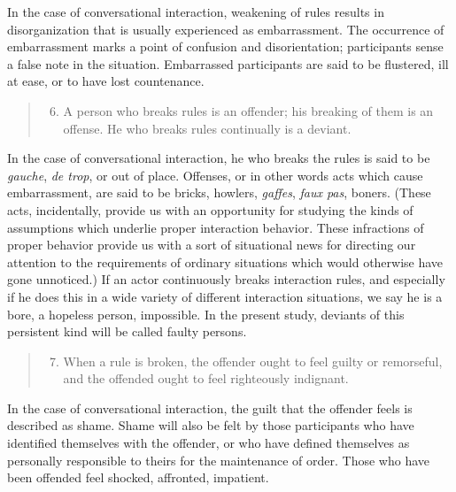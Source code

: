 \documentclass[twoside,symmetric,nobib,justified]{tufte-book}
\begin{document}
\noindent In the case of conversational interaction, weakening of rules results in
disorganization that is usually experienced as embarrassment. The
occurrence of embarrassment marks a point of confusion and
disorientation; participants sense a false note in the situation.
Embarrassed participants are said to be flustered, ill at ease, or to
have lost countenance.

\begin{quote}
\begin{enumerate}
\setcounter{enumi}{5}
\item
  A person who breaks rules is an offender; his breaking of them is an
  offense. He who breaks rules continually is a deviant.
\end{enumerate}
\end{quote}

\noindent In the case of conversational interaction, he who breaks the rules is
said to be \emph{gauche}, \emph{de trop}, or out of place. Offenses, or
in other words acts which cause embarrassment, are said to be bricks,
howlers, \emph{gaffes}, \emph{faux pas}, boners. (These acts,
incidentally, provide us with an opportunity for studying the kinds of
assumptions which underlie proper interaction behavior. These
infractions of proper behavior provide us with a sort of situational
news for directing our attention to the requirements of ordinary
situations which would otherwise have gone unnoticed.) If an actor
continuously breaks interaction rules, and especially if he does this in
a wide variety of different interaction situations, we say he is a bore,
a hopeless person, impossible. In the present study, deviants of this
persistent kind will be called faulty persons.


\begin{quote}
\begin{enumerate}
\setcounter{enumi}{6}
\item
  When a rule is broken, the offender ought to feel guilty or
  remorseful, and the offended ought to feel righteously indignant.
\end{enumerate}
\end{quote}

\noindent In the case of conversational interaction, the guilt that the offender
feels is described as shame. Shame will also be felt by those
participants who have identified themselves with the offender, or who
have defined themselves as personally responsible to theirs for the
maintenance of order. Those who have been offended feel shocked,
affronted, impatient.
\end{document}
